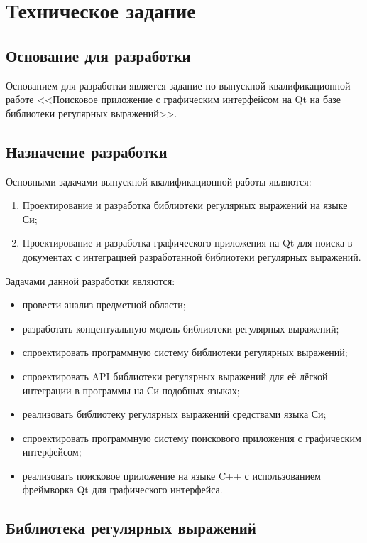 \section{Техническое задание}
\subsection{Основание для разработки}

Основанием для разработки является задание по выпускной квалификационной работе <<Поисковое приложение с графическим интерфейсом на Qt на базе библиотеки регулярных выражений>>.

\subsection{Назначение разработки}

Основными задачами выпускной квалификационной работы являются:
\begin{enumerate}
	\item Проектирование и разработка библиотеки регулярных выражений на языке Си;
	\item Проектирование и разработка графического приложения на Qt для поиска в документах с интеграцией разработанной библиотеки регулярных выражений.
	\end{enumerate}

Задачами данной разработки являются:
\begin{itemize}
	\item провести анализ предметной области;
	\item разработать концептуальную модель библиотеки регулярных выражений;
	\item спроектировать программную систему библиотеки регулярных выражений;
	\item спроектировать API библиотеки регулярных выражений для её лёгкой интеграции в программы на Си-подобных языках;
	\item реализовать библиотеку регулярных выражений средствами языка Си;
	\item спроектировать программную систему поискового приложения с графическим интерфейсом;
	\item реализовать поисковое приложение на языке C++ с использованием фреймворка Qt для графического интерфейса.

\end{itemize}

\subsection{Библиотека регулярных выражений}
